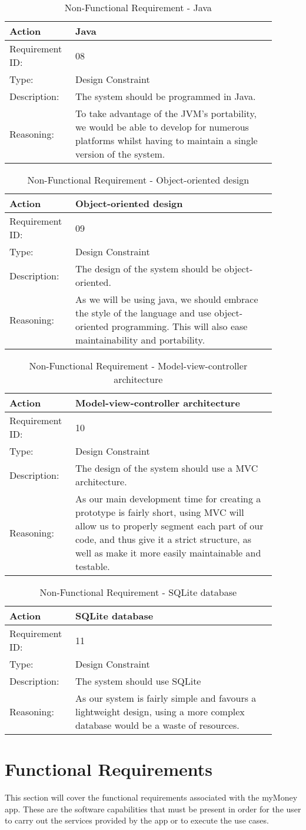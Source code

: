 \documentclass[11pt]{article}
\newcounter{use case ID}
\newcommand\addrow[2]{#1 & #2\\ \hline}
\newcounter{req ID}
\newcommand\tabularheadfsd[1]{
\begin{table}[ht]
    \addtocounter{req ID}{1}
    \caption{Non-Functional Requirement \arabic{req ID} - #1}
    \vspace{0.2cm}
    \begin{tabular}{|p{0.2\linewidth}|p{0.70\linewidth}|}
    \hline
        \textbf{Action} & \textbf{#1} \\
        \hline}
\newenvironment{requirement}{\tabularheadfsd}
{\hline\end{tabular}\end{table}}
\begin{document}
\begin{requirement}{Java}
    \addrow{Requirement ID:}{08}
    \addrow{Type:}{Design Constraint}
    \addrow{Description:}{The system should be programmed in Java.}
    \addrow{Reasoning:}{To take advantage of the JVM's portability, we would be able to develop for numerous platforms whilst having to maintain a single version of the system.}
    \end{requirement}

\begin{requirement}{Object-oriented design}
    \addrow{Requirement ID:}{09}
    \addrow{Type:}{Design Constraint}
    \addrow{Description:}{The design of the system should be object-oriented.}
    \addrow{Reasoning:}{As we will be using java, we should embrace the style of the language and use object-oriented programming. This will also ease maintainability and portability.}
    \end{requirement}

    \begin{requirement}{Model-view-controller architecture}
    \addrow{Requirement ID:}{10}
    \addrow{Type:}{Design Constraint}
    \addrow{Description:}{The design of the system should use a MVC architecture.}
    \addrow{Reasoning:}{As our main development time for creating a prototype is fairly short, using MVC will allow us to properly segment each part of our code, and thus give it a strict structure, as well as make it more easily maintainable and testable.}
    \end{requirement}

    \begin{requirement}{SQLite database}
    \addrow{Requirement ID:}{11}
    \addrow{Type:}{Design Constraint}
    \addrow{Description:}{The system should use SQLite}
    \addrow{Reasoning:}{As our system is fairly simple and favours a lightweight design, using a more complex database would be a waste of resources.}
    \end{requirement}

\clearpage

\section{Functional Requirements} \label{func req}

This section will cover the functional requirements associated with the myMoney app. These are the software capabilities that must be present in order for the user to carry out the services provided by the app or to execute the use cases.
\end{document}
